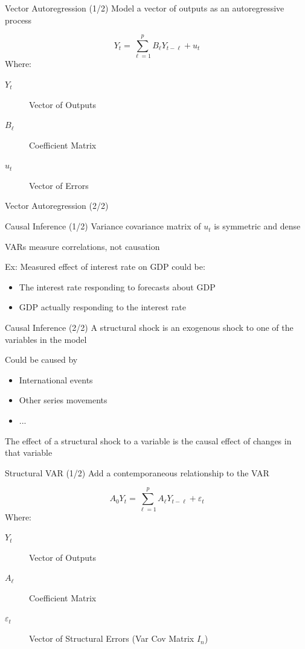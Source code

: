 \documentclass{beamer}
\begin{document}
\begin{frame}{Vector Autoregression (1/2)}
    Model a vector of outputs as an \alert{autoregressive process}

    \[
        Y_t = \sum_{\ell = 1}^p B_\ell Y_{t - \ell} + u_t
    \]
    Where:
    \begin{description}
        \item[$Y_t$] Vector of Outputs
        \item[$B_\ell$] Coefficient Matrix
        \item[$u_t$] Vector of Errors
    \end{description}
\end{frame}

\begin{frame}{Vector Autoregression (2/2)}
    \centering
    
\end{frame}

\begin{frame}{Causal Inference (1/2)}
    Variance covariance matrix of $u_t$ is symmetric and dense

    VARs measure \alert{correlations}, not \alert{causation} {\scriptsize \parencite{nakamura2018identification}}

    Ex: Measured effect of interest rate on GDP could be:
    \begin{itemize}
        \item The interest rate responding to forecasts about GDP
        \item GDP actually responding to the interest rate
    \end{itemize} 
\end{frame}

\begin{frame}{Causal Inference (2/2)}
    A \alert{structural shock} is an exogenous shock to one of the variables in the model

    Could be caused by
    \begin{itemize}
        \item International events
        \item Other series movements
        \item ...
    \end{itemize}

    The effect of a structural shock to a variable is the \alert{causal effect} of changes in that variable
\end{frame}

\begin{frame}{Structural VAR (1/2)}
    Add a contemporaneous relationship to the VAR

    \[
        A_0 Y_t = \sum_{\ell = 1}^p A_\ell Y_{t - \ell} + \varepsilon_t
    \]
    Where:
    \begin{description}
        \item[$Y_t$] Vector of Outputs
        \item[$A_\ell$] Coefficient Matrix
        \item[$\varepsilon_t$] Vector of \alert{Structural} Errors (Var Cov Matrix $I_n$)
    \end{description}
\end{frame}
\end{document}
